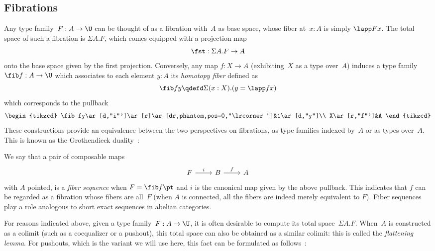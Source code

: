 \documentclass[a4paper]{article}
\begin{document}
\subsection{Fibrations}
\label{sec:action-fibration}
Any type family~$F:A\to\U$ can be thought of as a fibration with~$A$ as base space, whose fiber at~$x:A$ is simply $\lapp Fx$. The total space of such a fibration is $\Sigma A.F$, which comes equipped with a projection map
\[
  \fst:\Sigma A.F\to A
\]
onto the base space given by the first projection. Conversely, any map $f:X\to A$ (exhibiting~$X$ as a type over~$A$) induces a type family $\fib f:A\to\U$ which associates to each element $y:A$ its \emph{homotopy fiber} defined as
\[
  \fib f y\qdefd\Sigma(x:X).(y=\lapp fx)
\]
which corresponds to the pullback
\[
  \begin{tikzcd}
    \fib fy\ar[d,"i"']\ar[r]\ar[dr,phantom,pos=0,"\lrcorner"]&1\ar[d,"y"]\\
    X\ar[r,"f"']&A
  \end{tikzcd}
\]
These constructions provide an equivalence between the two perspectives on fibrations, as type families indexed by~$A$ or as types over~$A$. This is known as the Grothendieck duality~\cite[Theorem 4.8.3]{hottbook}:


We say that a pair of composable maps
\[
  \begin{tikzcd}
    F\ar[r,"i"]&B\ar[r,"f"]&A
  \end{tikzcd}
\]
with $A$ pointed, is a \emph{fiber sequence} when $F=\fib f\pt$ and $i$ is the canonical map given by the above pullback. This indicates that $f$ can be regarded as a fibration whose fibers are all~$F$ (when $A$ is connected, all the fibers are indeed merely equivalent to $F$). Fiber sequences play a role analogous to short exact sequences in abelian categories.

\label{sec:flattening}

For reasons indicated above, given a type family~$F:A\to\U$, it is often desirable to compute its total space~$\Sigma A.F$. When~$A$ is constructed as a colimit (such as a coequalizer or a pushout), this total space can also be obtained as a similar colimit: this is called the \emph{flattening lemma}. For pushouts, which is the variant we will use here, this fact can be formulated as follows~\cite[Lemma 8.5.3]{hottbook}:
\end{document}
